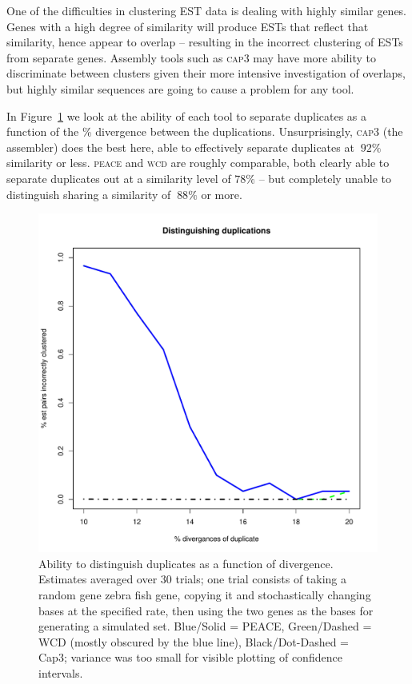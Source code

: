 \documentclass[a4paper,12pt]{article}
\newcommand{\peace} {{\small PEACE}}
\newcommand{\wcd} {{\small WCD}}
\newcommand{\capthree} {{\small Cap3}}
\begin{document}
\begin{appendix}
One of the difficulties in clustering EST data is dealing with
highly similar genes.  Genes with a high degree of similarity will
produce ESTs that reflect that similarity, hence appear to overlap --
resulting in the incorrect clustering of ESTs from separate genes.  Assembly tools
such as \textsc{cap3} may have more ability to discriminate between clusters
given their more intensive investigation of overlaps, but highly
similar sequences are going to cause a problem for any tool. 

In Figure~\ref{dups} we look at the ability of each tool to separate
duplicates as a function of the \% divergence between the
duplications.  Unsurprisingly, \textsc{cap3} (the assembler) does the best
here, able to effectively separate duplicates at $~92\%$ similarity
or less.  \textsc{peace} and \textsc{wcd} are roughly comparable, both clearly able to
separate duplicates out at a similarity level of $78\%$ -- but completely 
unable to distinguish sharing a similarity of $~88\%$ or more. 

\begin{figure}[tbp]
\centerline{
\includegraphics[scale=0.35]{pics.d/duplicates_40.pdf}
}
\caption{Ability to distinguish duplicates as a function of
  divergence.  Estimates averaged over 30 trials; one trial consists
  of taking a random gene zebra fish gene, copying it and stochastically changing
  bases at the specified rate, then using the two genes as the bases
  for generating a simulated set. Blue/Solid = \peace, Green/Dashed =
  \wcd\/ (mostly obscured by the blue line), Black/Dot-Dashed =
  \capthree; variance was too small for visible plotting of
  confidence intervals.}\label{dups}
\end{figure}


\end{appendix}
\end{document}
